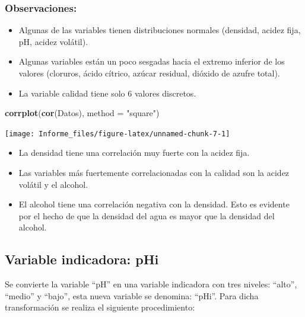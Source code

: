 \documentclass[
]{article}
\newenvironment{Shaded}{\begin{snugshade}}{\end{snugshade}}
\newcommand{\DataTypeTok}[1]{\textcolor[rgb]{0.13,0.29,0.53}{#1}}
\newcommand{\KeywordTok}[1]{\textcolor[rgb]{0.13,0.29,0.53}{\textbf{#1}}}
\newcommand{\NormalTok}[1]{#1}
\newcommand{\StringTok}[1]{\textcolor[rgb]{0.31,0.60,0.02}{#1}}
\begin{document}
\hypertarget{observaciones}{%
\subsubsection{Observaciones:}\label{observaciones}}

\begin{itemize}
\item
  Algunas de las variables tienen distribuciones normales (densidad,
  acidez fija, pH, acidez volátil).
\item
  Algunas variables están un poco sesgadas hacia el extremo inferior de
  los valores (cloruros, ácido cítrico, azúcar residual, dióxido de
  azufre total).
\item
  La variable calidad tiene solo 6 valores discretos.
\end{itemize}

\begin{Shaded}
\begin{Highlighting}[]
\KeywordTok{corrplot}\NormalTok{(}\KeywordTok{cor}\NormalTok{(Datos), }\DataTypeTok{method =} \StringTok{"square"}\NormalTok{)}
\end{Highlighting}
\end{Shaded}

\begin{center}\texttt{[image: Informe\_files/figure-latex/unnamed-chunk-7-1]} \end{center}

\begin{itemize}
\item
  La densidad tiene una correlación muy fuerte con la acidez fija.
\item
  Las variables más fuertemente correlacionadas con la calidad son la
  acidez volátil y el alcohol.
\item
  El alcohol tiene una correlación negativa con la densidad. Esto es
  evidente por el hecho de que la densidad del agua es mayor que la
  densidad del alcohol.
\end{itemize}

\hypertarget{variable-indicadora-phi}{%
\subsection{Variable indicadora: pHi}\label{variable-indicadora-phi}}

Se convierte la variable ``pH'' en una variable indicadora con tres
niveles: ``alto'', ``medio'' y ``bajo'', esta nueva variable se
denomina: ``pHi''. Para dicha transformación se realiza el siguiente
procedimiento:
\end{document}
